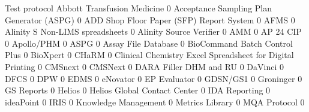 \documentclass{article}
\begin{document}
\begin{Schunk}
\begin{Soutput}
                                                            Test protocol
  Abbott Transfusion Medicine                                           0
  Acceptance Sampling Plan Generator (ASPG)                             0
  ADD Shop Floor Paper (SFP) Report System                              0
  AFMS                                                                  0
  Alinity S Non-LIMS spreadsheets                                       0
  Alinity Source Verifier                                               0
  AMM                                                                   0
  AP 24 CIP                                                             0
  Apollo/PHM                                                            0
  ASPG                                                                  0
  Assay File Database                                                   0
  BioCommand Batch Control Plus                                         0
  BioXpert                                                              0
  CHaRM                                                                 0
  Clinical Chemistry Excel Spreadsheet for Digital Printing             0
  CMSnext                                                               0
  CMSNext                                                               0
  DARA Filler DHM and RU                                                0
  DaVinci                                                               0
  DFCS                                                                  0
  DPW                                                                   0
  EDMS                                                                  0
  eNovator                                                              0
  EP Evaluator                                                          0
  GDSN/GS1                                                              0
  Groninger                                                             0
  GS Reports                                                            0
  Helios                                                                0
  Helios Global Contact Center                                          0
  IDA Reporting                                                         0
  ideaPoint                                                             0
  IRIS                                                                  0
  Knowledge Management                                                  0
  Metrics Library                                                       0
  MQA Protocol                                                          0

\end{Soutput}
\end{Schunk}
\end{document}
